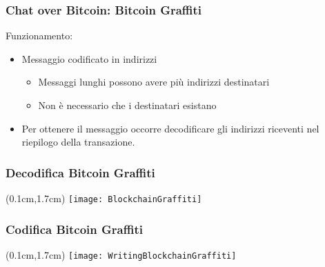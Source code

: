 \begin{frame}
 \frametitle{Chat over Bitcoin: Bitcoin Graffiti}
 
 Funzionamento:
 \begin{itemize}
  \item<1-> Messaggio codificato in indirizzi
  \begin{itemize}
   \item Messaggi lunghi possono avere più indirizzi destinatari
   \item Non è necessario che i destinatari esistano
  \end{itemize}
  \item<2-> Per ottenere il messaggio occorre decodificare gli indirizzi 
riceventi nel riepilogo della transazione.

 \end{itemize}

\end{frame}

\begin{frame}
 \frametitle{Decodifica Bitcoin Graffiti}

 \begin{textblock*}{5cm}(0.1cm,1.7cm)
  \texttt{[image: BlockchainGraffiti]}
 \end{textblock*}

\end{frame}


\begin{frame}
 \frametitle{Codifica Bitcoin Graffiti}

 \begin{textblock*}{5cm}(0.1cm,1.7cm)
  \texttt{[image: WritingBlockchainGraffiti]}
 \end{textblock*}

\end{frame}
